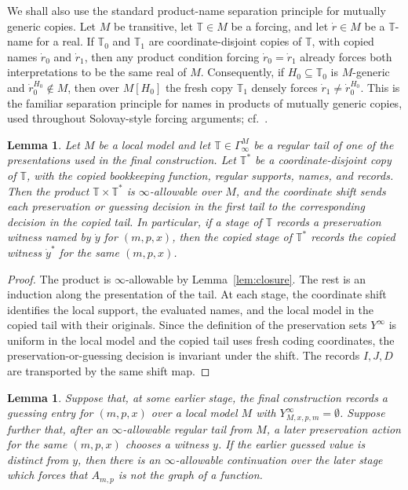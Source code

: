 \documentclass{article}
\newtheorem{lemma}[theorem]{Lemma}
\theoremstyle{remark}
\theoremstyle{plain}
\begin{document}
We shall also use the standard product-name separation principle for mutually
generic copies. Let $M$ be transitive, let $\mathbb T\in M$ be a forcing, and
let $\dot r\in M$ be a $\mathbb T$-name for a real. If $\mathbb T_0$ and
$\mathbb T_1$ are coordinate-disjoint copies of $\mathbb T$, with copied names
$\dot r_0$ and $\dot r_1$, then any product condition forcing
$\dot r_0=\dot r_1$ already forces both interpretations to be the same real of
$M$. Consequently, if $H_0\subseteq\mathbb T_0$ is $M$-generic and
$\dot r_0^{H_0}\notin M$, then over $M[H_0]$ the fresh copy $\mathbb T_1$ densely
forces $\dot r_1\neq\dot r_0^{H_0}$. This is the familiar separation principle
for names in products of mutually generic copies, used throughout Solovay-style
forcing arguments; cf.~\cite{Solovay1970}.

\begin{lemma}\label{lem:copying-tails}
Let $M$ be a local model and let $\mathbb T\in\Gamma^M_\infty$ be a regular tail
of one of the presentations used in the final construction. Let $\mathbb T^*$ be
a coordinate-disjoint copy of $\mathbb T$, with the copied bookkeeping function,
regular supports, names, and records. Then the product
$\mathbb T\times\mathbb T^*$ is $\infty$-allowable over $M$, and the coordinate
shift sends each preservation or guessing decision in the first tail to the
corresponding decision in the copied tail. In particular, if a stage of
$\mathbb T$ records a preservation witness named by $\dot y$ for $(m,p,x)$, then
the copied stage of $\mathbb T^*$ records the copied witness $\dot y^*$ for the
same $(m,p,x)$.
\end{lemma}

\begin{proof}
The product is $\infty$-allowable by Lemma~\ref{lem:closure}. The rest is an
induction along the presentation of the tail. At each stage, the coordinate
shift identifies the local support, the evaluated names, and the local model in
the copied tail with their originals. Since the definition of the preservation
sets $Y^\infty$ is uniform in the local model and the copied tail uses fresh
coding coordinates, the preservation-or-guessing decision is invariant under the
shift. The records $I,J,D$ are transported by the same shift map.
\end{proof}

\begin{lemma}\label{lem:squaring}
Suppose that, at some earlier stage, the final construction records a guessing
entry for $(m,p,x)$ over a local model $M$ with
$Y^\infty_{M,x,p,m}=\emptyset$. Suppose further that, after an
$\infty$-allowable regular tail from $M$, a later preservation action for the
same $(m,p,x)$ chooses a witness $y$. If the earlier guessed value is distinct
from $y$, then there is an $\infty$-allowable continuation over the later stage
which forces that $A_{m,p}$ is not the graph of a function.
\end{lemma}
\end{document}
